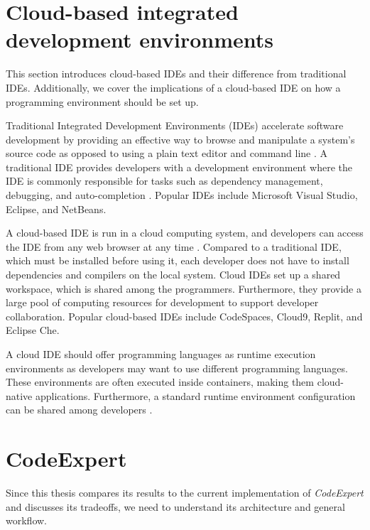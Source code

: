 \section{Cloud-based integrated development environments}\label{cloud-based-IDE}
This section introduces cloud-based IDEs and their difference from traditional IDEs. Additionally, we cover the implications of a cloud-based IDE on how a programming environment should be set up.

Traditional Integrated Development Environments (IDEs) accelerate software development by providing an effective way to browse and manipulate a system's source code as opposed to using a plain text editor and command line \cite{BruchBodden2010} \cite{FYLAKTOPOULOS2018127}. A traditional IDE provides developers with a development environment where the IDE is commonly responsible for tasks such as dependency management, debugging, and auto-completion \cite{Applis2019}. Popular IDEs include Microsoft Visual Studio, Eclipse, and NetBeans.

A cloud-based IDE is run in a cloud computing system, and developers can access the IDE from any web browser at any time \cite{Yanagisawa6354897}. Compared to a traditional IDE, which must be installed before using it, each developer does not have to install dependencies and compilers on the local system. Cloud IDEs set up a shared workspace, which is shared among the programmers. Furthermore, they provide a large pool of computing resources for development to support developer collaboration. Popular cloud-based IDEs include CodeSpaces, Cloud9, Replit, and Eclipse Che. 

A cloud IDE should offer programming languages as runtime execution environments as developers may want to use different programming languages. These environments are often executed inside containers, making them cloud-native applications. Furthermore, a standard runtime environment configuration can be shared among developers \cite{Applis2019}\cite{FYLAKTOPOULOS2018127}.

\section{CodeExpert}\label{CodeExpert}
Since this thesis compares its results to the current implementation of \emph{CodeExpert} and discusses its tradeoffs, we need to understand its architecture and general workflow.

